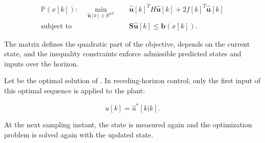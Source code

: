 \noindent
\begin{equation}
	\begin{aligned}
		\mathbb{P}(x[k]): \quad
		\min_{\mathbf{\hat{u}}[k] \in \mathbb{R}^{pN}}
		&\quad
		\mathbf{\hat{u}}[k]^T H \mathbf{\hat{u}}[k]
		+ 2 f[k]^T \mathbf{\hat{u}}[k] \\
		\text{subject to}
		&\quad
		\mathbf{S}\mathbf{\hat{u}}[k] \le \mathbf{b}(x[k]).
	\end{aligned}
\end{equation}

\noindent
The matrix  defines the quadratic part of the objective,  depends on the current state, and the inequality constraints enforce admissible predicted states and inputs over the horizon.

Let  be the optimal solution of . In receding-horizon control, only the first input of this optimal sequence is applied to the plant:

\noindent
\begin{equation}
	u[k] = \hat{u}^*[k|k].
\end{equation}

\noindent
At the next sampling instant, the state is measured again and the optimization problem is solved again with the updated state.
